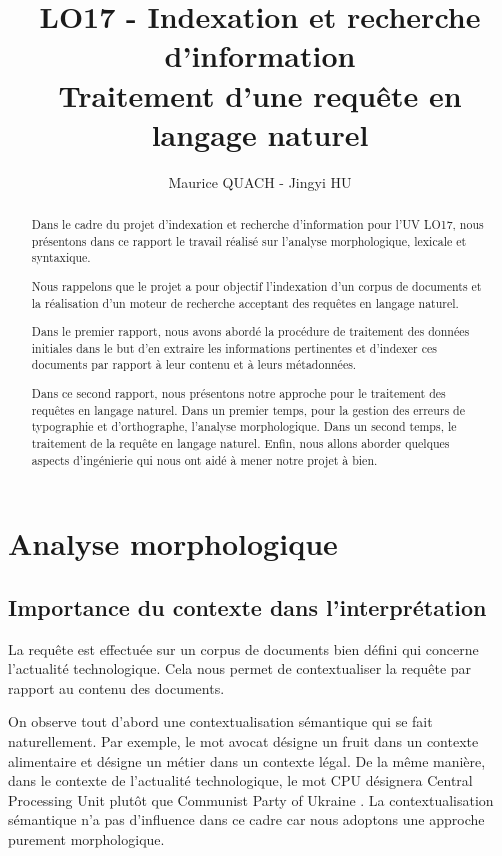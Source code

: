 \documentclass[a4paper]{elsarticle}
\title{LO17 - Indexation et recherche d'information\\Traitement d'une requête en langage naturel}
\author{Maurice QUACH - Jingyi HU}
\begin{document}
\begin{frontmatter}
\address{Université de Technologie de Compiègne, France}

\begin{abstract}
Dans le cadre du projet d’indexation et recherche d’information pour l’UV LO17, nous présentons dans ce rapport le travail réalisé sur l'analyse morphologique, lexicale et syntaxique.

Nous rappelons que le projet a pour objectif l'indexation d'un corpus de documents et la réalisation d'un moteur de recherche acceptant des requêtes en langage naturel.

Dans le premier rapport, nous avons abordé la procédure de traitement des données initiales dans le but d'en extraire les informations pertinentes et d'indexer ces documents par rapport à leur contenu et à leurs métadonnées.

Dans ce second rapport, nous présentons notre approche pour le traitement des requêtes en langage naturel. Dans un premier temps, pour la gestion des erreurs de typographie et d'orthographe, l'analyse morphologique. Dans un second temps, le traitement de la requête en langage naturel. Enfin, nous allons aborder quelques aspects d'ingénierie qui nous ont aidé à mener notre projet à bien.
\end{abstract}
\end{frontmatter}


\section{Analyse morphologique} \label{analysemorphologique}

\subsection{Importance du contexte dans l'interprétation}

La requête est effectuée sur un corpus de documents bien défini qui concerne l'actualité technologique. Cela nous permet de contextualiser la requête par rapport au contenu des documents.

On observe tout d'abord une contextualisation sémantique qui se fait naturellement. Par exemple, le mot \og avocat \fg{} désigne un fruit dans un contexte alimentaire et désigne un métier dans un contexte légal. De la même manière, dans le contexte de l'actualité technologique, le mot \og CPU \fg{} désignera \og Central Processing Unit \fg{} plutôt que \og Communist Party of Ukraine \fg{}. La contextualisation sémantique n'a pas d'influence dans ce cadre car nous adoptons une approche purement morphologique. 
\end{document}
